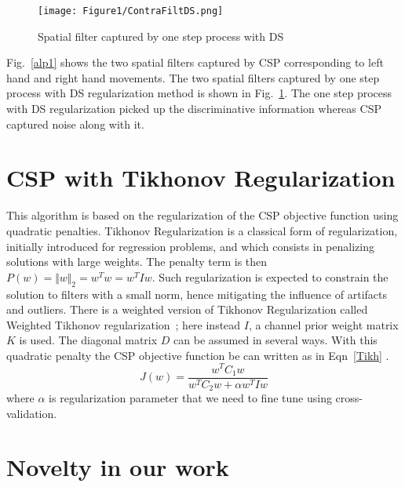 \begin{figure}[hbtp]
\centering
\texttt{[image: Figure1/ContraFiltDS.png]}
\caption{Spatial filter captured by one step process with DS}
\label{CSPDSComp}
\end{figure}
Fig.~\ref{alp1} shows the two spatial filters captured by CSP corresponding to left hand and right hand movements. The two spatial filters captured by one step process with DS regularization method is shown in Fig.~\ref{CSPDSComp}. The one step process with DS regularization picked up the discriminative information whereas CSP captured noise along with it. 


\section{CSP with Tikhonov Regularization}


This algorithm is based on the regularization of the CSP objective function using quadratic penalties. Tikhonov Regularization is a classical form of regularization, initially introduced for regression problems, and which consists in penalizing solutions with large weights. The penalty term is then $P(w)= \Vert w \Vert_2= w^T w= w^T Iw$. Such regularization is expected to constrain the solution to filters with a small norm, hence mitigating the influence of artifacts and outliers. There is a weighted version of Tikhonov Regularization called Weighted Tikhonov regularization~\cite{34}; here instead $I$, a channel prior weight matrix $K$ is used. The diagonal matrix $D$ can be assumed in several ways. With this quadratic penalty the CSP objective function be can written as in Eqn~\ref{Tikh} .
\begin{equation}
J\left(w\right)=\frac{w^T C_1 w}{w^T C_2 w + \alpha w^T I w}
\label{Tikh}
\end{equation}
where $\alpha$ is regularization parameter that we need to fine tune using cross-validation. 

\section{Novelty in our work}

